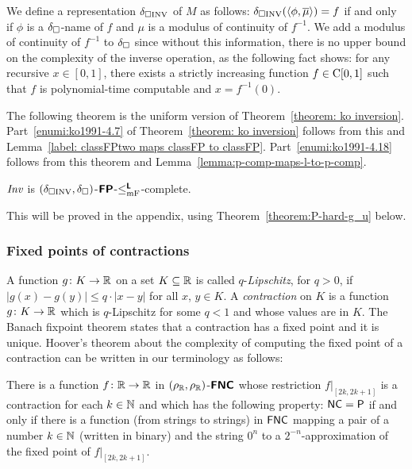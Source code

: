 \documentclass[envcountsect,envcountsame,orivec,oribibl]{llncs}
\begin{document}
We define a representation $\delta _{\square \mathrm{INV}}$ of $M$ as follows:
$\delta _{\square \mathrm{INV}}(\langle \phi, \overline{\mu} \rangle) = f$ 
if and only if $\phi$ is a $\delta _\square$-name of $f$ 
and $\mu$ is a modulus of continuity of $f^{-1}$.
We add a modulus of continuity of $f^{-1}$ to $\delta _\square$
since without this information, there is no upper bound on 
the complexity of the inverse operation, 
as the following fact \cite[Theorem 4.4]{ko1991complexity} shows: 
for any recursive $x \in [0, 1]$, 
there exists a strictly increasing function $f \in \mathrm C[0, 1]$ 
such that $f$ is polynomial-time computable and $x = f^{-1}(0)$.

The following theorem is the uniform version of Theorem~\ref{theorem: ko inversion}. 
Part~\ref{enumi:ko1991-4.7} of Theorem~\ref{theorem: ko inversion} 
follows from this and Lemma~\ref{label: classFPtwo maps classFP to classFP}.
Part~\ref{enumi:ko1991-4.18} follows from this theorem and Lemma~\ref{lemma:p-comp-maps-l-to-p-comp}.

\begin{theorem}
 \label{theorem:INV-is-P-complete}
 $\mathit{Inv}$ is $(\delta _{\square \mathrm{INV}}, \delta _\square)$-$\text{\bfseries \sffamily \upshape FP}$-$\leq _{\mathrm{mF}} ^{\text{\bfseries \sffamily \upshape L}}$-complete.
\end{theorem}

This will be proved in the appendix, 
using 
Theorem~\ref{theorem:P-hard-g_u} below. 

\subsubsection{Fixed points of contractions}

A function $g \colon K \to \mathbb R$ on a set $K \subseteq \mathbb R$
is called $q$-\emph{Lipschitz}, for $q > 0$, 
if $
\lvert g (x) - g (y) \rvert \leq q \cdot \lvert x - y \rvert
$ for all $x$, $y \in K$. 
A \emph{contraction} on $K$ is 
a function $g \colon K \to \mathbb R$ which is $q$-Lipschitz for some $q < 1$
and whose values are in $K$. 
The Banach fixpoint theorem states that 
a contraction has a fixed point and it is unique. 
Hoover's theorem about the complexity of computing the fixed point
of a contraction can be written in our terminology as follows:

\begin{theorem}
\label{theorem:hoover1991-4.5}
 There is a function $f \colon \mathbb R \to \mathbb R$ in $(\rho _\mathbb R, \rho _\mathbb R)$-$\text{\bfseries \sffamily \upshape FNC}$
 whose restriction $f|_{[2k, 2k+1]}$ is a contraction for each $k \in \mathbb N$ and
 which has the following property: 
 $\mathsf{NC} = \mathsf{P}$ if and only if 
 there is a function (from strings to strings) in $\mathsf{FNC}$ mapping 
 a pair of a number $k \in \mathbb N$ (written in binary) and the string $0^n$
 to a $2^{-n}$-approximation of the 
 fixed point of $f |_{[2k, 2k + 1]}$. 
\end{theorem}
\end{document}
